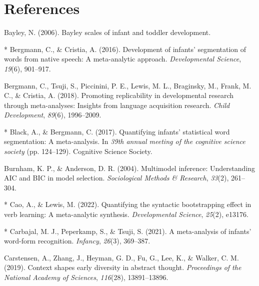 \documentclass[10pt, letterpaper]{article}
\newenvironment{CSLReferences}%
  {}%
  {\par}
\begin{document}
\hypertarget{references}{%
\section{References}\label{references}}

\setlength{\parindent}{-0.1in} 
\setlength{\leftskip}{0.125in}

\noindent

\hypertarget{refs}{}
\begin{CSLReferences}
\leavevmode{}%
Bayley, N. (2006). Bayley scales of infant and toddler development.

\leavevmode{}%
* Bergmann, C., \& Cristia, A. (2016). Development of infants'
segmentation of words from native speech: A meta-analytic approach.
\emph{Developmental Science}, \emph{19}(6), 901--917.

\leavevmode{}%
Bergmann, C., Tsuji, S., Piccinini, P. E., Lewis, M. L., Braginsky, M.,
Frank, M. C., \& Cristia, A. (2018). Promoting replicability in
developmental research through meta-analyses: Insights from language
acquisition research. \emph{Child Development}, \emph{89}(6),
1996--2009.

\leavevmode{}%
* Black, A., \& Bergmann, C. (2017). Quantifying infants' statistical
word segmentation: A meta-analysis. In \emph{39th annual meeting of the
cognitive science society} (pp. 124--129). Cognitive Science Society.

\leavevmode{}%
Burnham, K. P., \& Anderson, D. R. (2004). Multimodel inference:
Understanding AIC and BIC in model selection. \emph{Sociological Methods
\& Research}, \emph{33}(2), 261--304.

\leavevmode{}%
* Cao, A., \& Lewis, M. (2022). Quantifying the syntactic bootstrapping
effect in verb learning: A meta-analytic synthesis. \emph{Developmental
Science}, \emph{25}(2), e13176.

\leavevmode{}%
* Carbajal, M. J., Peperkamp, S., \& Tsuji, S. (2021). A meta-analysis
of infants' word-form recognition. \emph{Infancy}, \emph{26}(3),
369--387.

\leavevmode{}%
Carstensen, A., Zhang, J., Heyman, G. D., Fu, G., Lee, K., \& Walker, C.
M. (2019). Context shapes early diversity in abstract thought.
\emph{Proceedings of the National Academy of Sciences}, \emph{116}(28),
13891--13896.


\end{CSLReferences}
\end{document}
